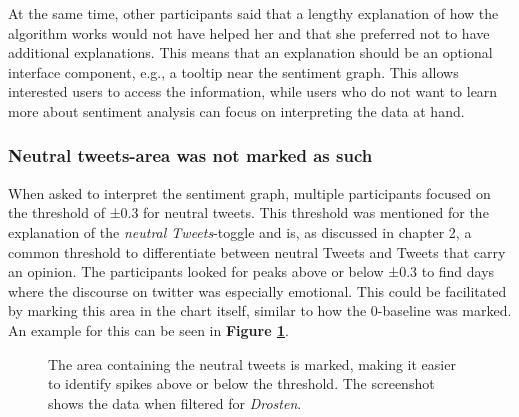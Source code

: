 At the same time, other participants said that a lengthy explanation of how the algorithm works would not have helped her and that she preferred not to have additional explanations. This means that an explanation should be an optional interface component, e.g., a tooltip near the sentiment graph. This allows interested users to access the information, while users who do not want to learn more about sentiment analysis can focus on interpreting the data at hand.

\subsubsection*{Neutral tweets-area was not marked as such}
When asked to interpret the sentiment graph, multiple participants focused on the threshold of ±0.3 for neutral tweets. This threshold was mentioned for the explanation of the \emph{neutral Tweets}-toggle and is, as discussed in chapter 2, a common threshold to differentiate between neutral Tweets and Tweets that carry an opinion. The participants looked for peaks above or below ±0.3 to find days where the discourse on twitter was especially emotional. This could be facilitated by marking this area in the chart itself, similar to how the 0-baseline was marked. An example for this can be seen in \textbf{Figure \ref{fig:sentiment_neutral_area}}.

\begin{figure}[h!tb]
    \centering
    \caption{The area containing the neutral tweets is marked, making it easier to identify spikes above or below the threshold. The screenshot shows the data when filtered for \emph{Drosten}.}
    \label{fig:sentiment_neutral_area}
\end{figure}

